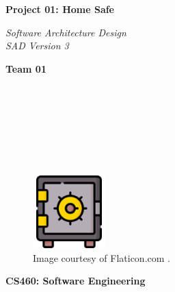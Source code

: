 \documentclass{article}
\begin{document}
\begin{titlepage}
\begin{center}
\vspace*{1cm}

\Huge
\textbf{Project 01: Home Safe}

\vspace{0.5cm}
\Large
\textit{Software Architecture Design} \\
\textit{SAD Version 3}

\vspace{1cm}

\textbf{Team 01}

\vspace{0.5cm}

 \\
 \\
 \\
 \\
 \\
 \\

\vspace{1cm}

\begin{figure}[h]
    \centering
    \includegraphics[width=0.25\textwidth]{docs/figs/safe.png}
    \caption*{Image courtesy of Flaticon.com \cite{flaticonSafeDeposit}.}
    \label{fig:safeIcon}
\end{figure}

\vspace{7cm}

\Large
\textbf{CS460: Software Engineering} \\

\end{center}
\end{titlepage}

\newpage

\tableofcontents

\newpage
\end{document}
